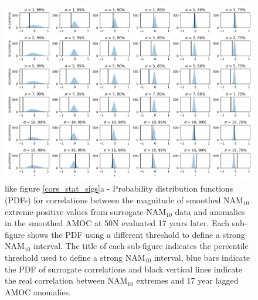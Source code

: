 \begin{landscape}
 \begin{figure}
\begin{center}
\noindent\includegraphics[width =\linewidth]{Figures/Figures-surface/cors_sigs_thresh_and_sigma.png} 
\caption{like figure \ref{cors_stat_sigs}a - Probability distribution functions (PDFs) for correlations between the magnitude of smoothed NAM$_{10}$ extreme positive values from surrogate NAM$_{10}$ data and anomalies in the smoothed AMOC at 50N evaluated 17 years later. Each sub-figure shows the PDF using a different threshold to define a strong NAM$_{10}$ interval. The title of each sub-figure indicates the percentile threshold used to define a strong NAM$_{10}$ interval, blue bars indicate the PDF of surrogate correlations and black vertical lines indicate the real correlation between NAM$_{10}$ extremes and 17 year lagged AMOC anomalies.}
\label{different_thresh_weak}
\end{center}
 \end{figure}
\end{landscape}

